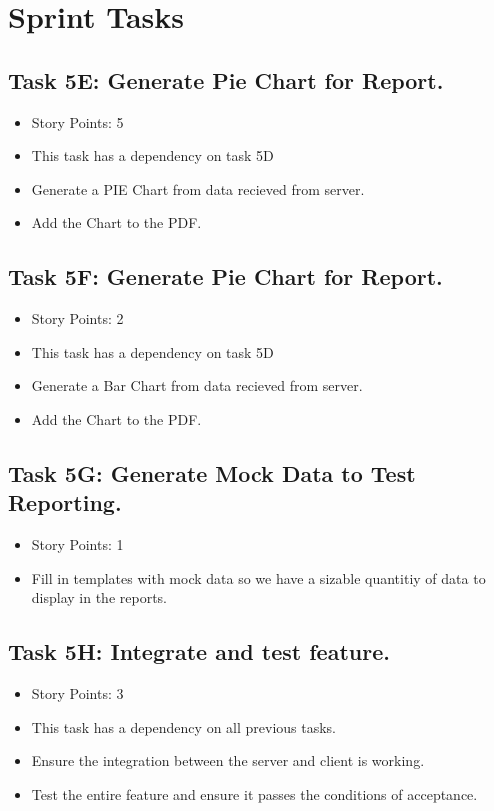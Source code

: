 \documentclass[12pt]{article}
\begin{document}
\textcolor{black}{\tableofcontents}
\pagebreak


\section{Sprint Tasks}

\subsection{Task 5E: Generate Pie Chart for Report.}
\begin{itemize}%
\item Story Points: 5
\item This task has a dependency on task 5D
\item Generate a PIE Chart from data recieved from server.
\item Add the Chart to the PDF.
\end{itemize}

\subsection{Task 5F: Generate Pie Chart for Report.}
\begin{itemize}%
\item Story Points: 2
\item This task has a dependency on task 5D
\item Generate a Bar Chart from data recieved from server.
\item Add the Chart to the PDF.
\end{itemize}

\subsection{Task 5G: Generate Mock Data to Test Reporting.}
\begin{itemize}%
\item Story Points: 1
\item Fill in templates with mock data so we have a sizable quantitiy of data to display in the reports.
\end{itemize}

\subsection{Task 5H: Integrate and test feature.}
\begin{itemize}%
\item Story Points: 3
\item This task has a dependency on all previous tasks.
\item Ensure the integration between the server and client is working.
\item Test the entire feature and ensure it passes the conditions of acceptance.
\end{itemize}
\end{document}
